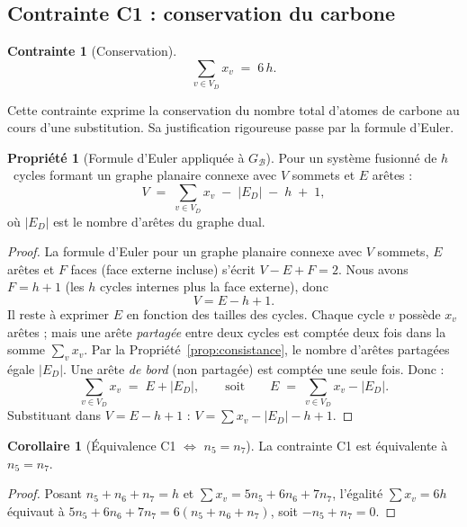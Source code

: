 \documentclass[12pt,a4paper]{article}
\theoremstyle{definition}
\newtheorem{propriete}[definition]{Propri\'et\'e}
\newtheorem{contrainte}[definition]{Contrainte}
\newtheorem{corollaire}[definition]{Corollaire}
\theoremstyle{remark}
\newcommand{\B}{\mathcal{B}}
\newcommand{\GB}{G_{\!\B}}
\newcommand{\VD}{V_{\!D}}
\newcommand{\ED}{E_{\!D}}
\newcommand{\xv}{x_v}
\newcommand{\ncinq}{n_5}
\newcommand{\nsept}{n_7}
\newcommand{\nhex}{n_6}
\begin{document}
\subsection{Contrainte C1 : conservation du carbone}

\begin{contrainte}[Conservation]
\label{c:carbone}
\[
  \sum_{v \in \VD} \xv \;=\; 6\,h.
\]
\end{contrainte}

Cette contrainte exprime la conservation du nombre total d'atomes de
carbone au cours d'une substitution. Sa justification rigoureuse passe
par la formule d'Euler.

\begin{propriete}[Formule d'Euler appliqu\'ee \`a $\GB$]
\label{prop:euler}
Pour un syst\`eme fusionn\'e de $h$~cycles formant un graphe planaire
connexe avec $V$ sommets et $E$ ar\^etes :
\[
  V \;=\; \sum_{v \in \VD} \xv \;-\; |\ED| \;-\; h \;+\; 1,
\]
o\`u $|\ED|$ est le nombre d'ar\^etes du graphe dual.
\end{propriete}

\begin{proof}
La formule d'Euler pour un graphe planaire connexe avec $V$ sommets,
$E$ ar\^etes et $F$ faces (face externe incluse) s'\'ecrit
$V - E + F = 2$. Nous avons $F = h + 1$ (les $h$ cycles internes plus
la face externe), donc
\[
  V = E - h + 1.
\]
Il reste \`a exprimer $E$ en fonction des tailles des cycles. Chaque
cycle $v$ poss\`ede $\xv$ ar\^etes ; mais une ar\^ete \emph{partag\'ee}
entre deux cycles est compt\'ee deux fois dans la somme
$\sum_{v} \xv$. Par la Propri\'et\'e~\ref{prop:consistance}, le nombre
d'ar\^etes partag\'ees \'egale $|\ED|$. Une ar\^ete \emph{de bord} (non
partag\'ee) est compt\'ee une seule fois. Donc :
\[
  \sum_{v \in \VD} \xv \;=\; E + |\ED|,
  \qquad\text{soit}\qquad
  E \;=\; \sum_{v \in \VD} \xv - |\ED|.
\]
Substituant dans $V = E - h + 1$ : $V = \sum \xv - |\ED| - h + 1$.
\end{proof}

\begin{corollaire}[\'Equivalence C1 $\Leftrightarrow$ $\ncinq = \nsept$]
La contrainte C1 est \'equivalente \`a $\ncinq = \nsept$.
\end{corollaire}

\begin{proof}
Posant $\ncinq + \nhex + \nsept = h$ et
$\sum \xv = 5\ncinq + 6\nhex + 7\nsept$, l'\'egalit\'e
$\sum \xv = 6h$ \'equivaut \`a
$5\ncinq + 6\nhex + 7\nsept = 6(\ncinq + \nhex + \nsept)$,
soit $-\ncinq + \nsept = 0$.
\end{proof}
\end{document}
